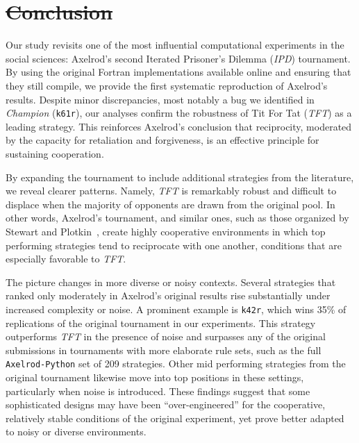 \documentclass{article}
\newcommand{\TFT}{\emph{TFT}}
\newcommand{\IPD}{\emph{IPD}}
\newcommand{\AXL}{\texttt{Axelrod-Python}}
\providecommand{\DIFaddtex}[1]{{\protect\color{blue}\uwave{#1}}} %
\providecommand{\DIFdeltex}[1]{{\protect\color{red}\sout{#1}}}                      %
\providecommand{\DIFaddbegin}{} %
\providecommand{\DIFaddend}{} %
\providecommand{\DIFdelbegin}{} %
\providecommand{\DIFdelend}{} %
\providecommand{\DIFadd}[1]{\texorpdfstring{\DIFaddtex{#1}}{#1}} %
\providecommand{\DIFdel}[1]{\texorpdfstring{\DIFdeltex{#1}}{}} %
\newcommand{\DIFscaledelfig}{0.5}
\newlength{\DIFdelgraphicswidth} %
\newlength{\DIFdelgraphicsheight} %
\newcommand{\DIFaddincludegraphics}[2][]{{\color{blue}\fbox{\DIFOincludegraphics[#1]{#2}}}} %
\newcommand{\DIFdelincludegraphics}[2][]{%
\sbox{\DIFdelgraphicsbox}{\DIFOincludegraphics[#1]{#2}}%
\settoboxwidth{\DIFdelgraphicswidth}{\DIFdelgraphicsbox} %
\settoboxtotalheight{\DIFdelgraphicsheight}{\DIFdelgraphicsbox} %
\scalebox{\DIFscaledelfig}{%
\parbox[b]{\DIFdelgraphicswidth}{\usebox{\DIFdelgraphicsbox}\\[-\baselineskip] \rule{\DIFdelgraphicswidth}{0em}}\llap{\resizebox{\DIFdelgraphicswidth}{\DIFdelgraphicsheight}{%
\setlength{\unitlength}{\DIFdelgraphicswidth}%
\begin{picture}(1,1)%
\thicklines\linethickness{2pt} %
{\color[rgb]{1,0,0}\put(0,0){\framebox(1,1){}}}%
{\color[rgb]{1,0,0}\put(0,0){\line( 1,1){1}}}%
{\color[rgb]{1,0,0}\put(0,1){\line(1,-1){1}}}%
\end{picture}%
}\hspace*{3pt}}} %
} %
\DeclareRobustCommand{\DIFaddbegin}{\DIFOaddbegin \let\includegraphics\DIFaddincludegraphics} %
\DeclareRobustCommand{\DIFaddend}{\DIFOaddend \let\includegraphics\DIFOincludegraphics} %
\DeclareRobustCommand{\DIFdelbegin}{\DIFOdelbegin \let\includegraphics\DIFdelincludegraphics} %
\DeclareRobustCommand{\DIFdelend}{\DIFOaddend \let\includegraphics\DIFOincludegraphics} %
\begin{document}
\section*{\DIFdelbegin \DIFdel{Conclusion}\DIFdelend \DIFaddbegin \DIFadd{Discussion}\DIFaddend }\label{sec:discussion}

Our study revisits one of the most influential computational experiments in the
social sciences: Axelrod's second Iterated Prisoner's Dilemma (\IPD) tournament.
By using the original Fortran implementations available online and ensuring
that they still compile, we provide the first systematic reproduction of
Axelrod's results. Despite minor discrepancies, most notably a bug we identified
in \emph{Champion} (\texttt{k61r}), our analyses confirm the robustness of Tit
For Tat (\TFT{}) as a leading strategy. This reinforces Axelrod's conclusion
that reciprocity, moderated by the capacity for retaliation and forgiveness, is
an effective principle for sustaining cooperation.

By expanding the tournament to include additional strategies from the
literature, we reveal clearer patterns. Namely, \TFT{} is remarkably robust and
difficult to displace when the majority of opponents are drawn from the original
pool. In other words, Axelrod's tournament, and similar ones, such as those
organized by Stewart and Plotkin~\cite{Stewart2012}, create highly cooperative
environments in which top performing strategies tend to reciprocate with one
another, conditions that are especially favorable to \TFT.

The picture changes in more diverse or noisy contexts. Several strategies
that ranked only moderately in Axelrod's original results rise substantially
under increased complexity or noise. A prominent example is \texttt{k42r}, which
wins 35\% of replications of the original tournament in our experiments. This
strategy outperforms \TFT{} in the presence of noise and surpasses any of the
original submissions in tournaments with more elaborate rule sets, such as the
full \AXL{} set of 209 strategies. Other mid performing strategies from the
original tournament likewise move into top positions in these settings,
particularly when noise is introduced. These findings suggest that some
sophisticated designs may have been ``over-engineered'' for the cooperative,
relatively stable conditions of the original experiment, yet prove better
adapted to noisy or diverse environments.
\end{document}
